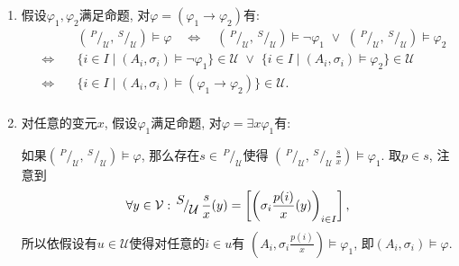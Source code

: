 \begin{enumerate}
    \item 假设$\varphi_1,\varphi_2$满足命题, 对$\varphi=(\varphi_1\to\varphi_2)$有:
    \vspace{5pt}
    \[\begin{aligned}
        &\left(\,^{\displaystyle P}\!/_{\displaystyle\mathcal{U}},\,
        ^{\displaystyle S}\!/_{\displaystyle\mathcal{U}}\right)\models\varphi
        \quad\iff\quad\left(\,^{\displaystyle P}\!/_{\displaystyle\mathcal{U}},\,
        ^{\displaystyle S}\!/_{\displaystyle\mathcal{U}}\right)\models\neg\varphi_1
        \,\,\lor\,\,\left(\,^{\displaystyle P}\!/_{\displaystyle\mathcal{U}},\,
        ^{\displaystyle S}\!/_{\displaystyle\mathcal{U}}\right)\models\varphi_2\\
        \quad\iff\quad&\{i\in I\mid(A_i,\sigma_i)\models\neg\varphi_1\}\in\mathcal{U}
        \,\,\lor\,\,\{i\in I\mid(A_i,\sigma_i)\models\varphi_2\}\in\mathcal{U}\\
        \quad\iff\quad&\{i\in I\mid(A_i,\sigma_i)\models(\varphi_1\to\varphi_2)\}
        \in\mathcal{U}.\\[3pt]
    \end{aligned}\]

    \item 对任意的变元$x$, 假设$\varphi_1$满足命题, 对$\varphi=\exists x\varphi_1$有:
    
    \vspace{3pt}\hspace{2.17em}
    如果$\left(\,^{\displaystyle P}\!/_{\displaystyle\mathcal{U}},\,
    ^{\displaystyle S}\!/_{\displaystyle\mathcal{U}}\right)\models\varphi$,
    那么存在$s\in\,\!^{\displaystyle P}\!/_{\displaystyle\mathcal{U}}$使得
    $\left(\,^{\displaystyle P}\!/_{\displaystyle\mathcal{U}},\,^{\displaystyle S}
    \!/_{\displaystyle\mathcal{U}}\,\displaystyle\frac{s}{x}\right)\models\varphi_1$.
    取$p\in s$, 注意到
    \vspace{3pt}
    \[
        \forall y\in\mathcal{V}:\,^{\displaystyle S}
        \!/_{\displaystyle\mathcal{U}}\,\displaystyle\frac{s}{x}(y)
        =\left[\left(\sigma_i\frac{p(i)}{x}(y)\right)_{i\in I}\right],\\[3pt]
    \]
    所以依假设有$u\in\mathcal{U}$使得对任意的$i\in u$有
    $\left(A_i,\sigma_i\displaystyle\frac{p(i)}{x}\right)\models\varphi_1$,
    即$(A_i,\sigma_i)\models\varphi$.


\end{enumerate}
